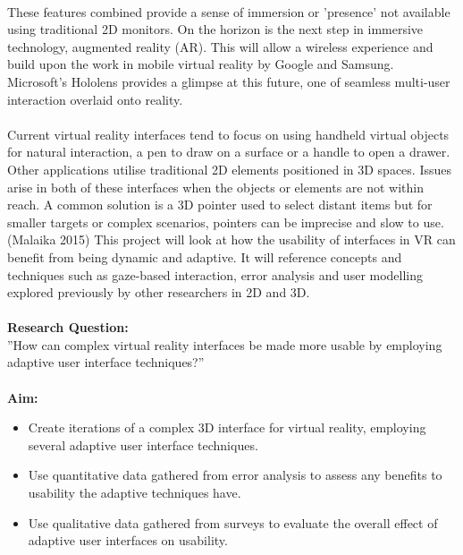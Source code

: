 \documentclass[11pt]{article}
\begin{document}
\paragraph{} 
These features combined provide a sense of immersion or 'presence' not available using traditional 2D monitors. On the horizon is the next step in immersive technology, augmented reality (AR). This will allow a wireless experience and build upon the work in mobile virtual reality by Google and Samsung. Microsoft's Hololens provides a glimpse at this future, one of seamless multi-user interaction overlaid onto reality.

\paragraph{} 
Current virtual reality interfaces tend to focus on using handheld virtual objects for natural interaction, a pen to draw on a surface or a handle to open a drawer. Other applications utilise traditional 2D elements positioned in 3D spaces. Issues arise in both of these interfaces when the objects or elements are not within reach. A common solution is a 3D pointer used to select distant items but for smaller targets or complex scenarios, pointers can be imprecise and slow to use. (Malaika 2015) This project will look at how the usability of interfaces in VR can benefit from being dynamic and adaptive. It will reference concepts and techniques such as gaze-based interaction, error analysis and user modelling explored previously by other researchers in 2D and 3D.

\paragraph{} 
\textbf{Research Question:} \\
''How can complex virtual reality interfaces be made more usable by employing adaptive user interface techniques?''

\paragraph{} 
\textbf{Aim:}
\begin{itemize}
\item Create iterations of a complex 3D interface for virtual reality, employing several adaptive user interface techniques.
\item Use quantitative data gathered from error analysis to assess any benefits to usability the adaptive techniques have.
\item Use qualitative data gathered from surveys to evaluate the overall effect of adaptive user interfaces on usability.
\end{itemize}
\end{document}
